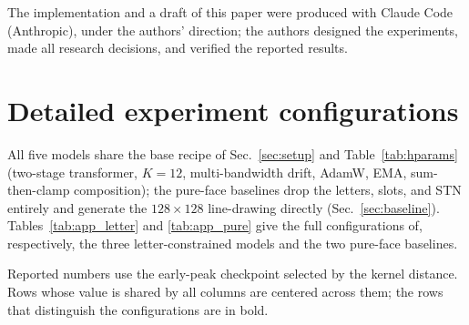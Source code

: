 \documentclass{article}
\begin{document}
\begin{ack}
The implementation and a draft of this paper were produced with Claude Code (Anthropic), under the
authors' direction; the authors designed the experiments, made all research decisions, and verified the
reported results.
\end{ack}

\small



\appendix
\section{Detailed experiment configurations}
\label{app:configs}
All five models share the base recipe of Sec.~\ref{sec:setup} and Table~\ref{tab:hparams} (two-stage
transformer, $K{=}12$, multi-bandwidth drift, AdamW, EMA, sum-then-clamp composition); the pure-face
baselines drop the letters, slots, and STN entirely and generate the $128{\times}128$ line-drawing
directly (Sec.~\ref{sec:baseline}). Tables~\ref{tab:app_letter} and \ref{tab:app_pure} give the full
configurations of, respectively, the three letter-constrained models and the two pure-face baselines.

Reported numbers use the early-peak checkpoint selected by the kernel distance. Rows whose value is
shared by all columns are centered across them; the rows that distinguish the configurations are in
bold.
\end{document}
